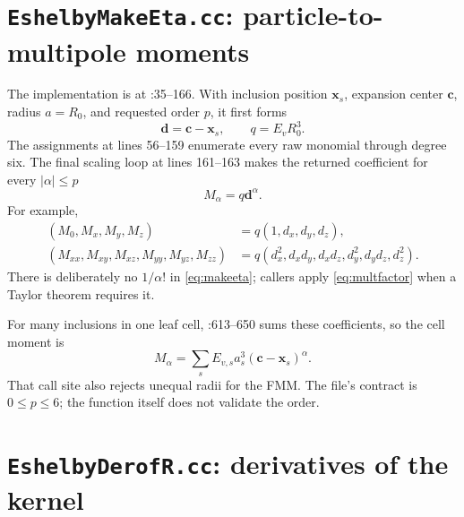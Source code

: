 \documentclass[11pt]{article}
\newcommand{\vect}[1]{\bm{#1}}
\newcommand{\abs}[1]{\left\lvert #1\right\rvert}
\begin{document}
\section{\texttt{EshelbyMakeEta.cc}: particle-to-multipole moments}

The implementation is at :35--166.  With inclusion
position \(\vect{x}_s\), expansion center \(\vect{c}\), radius \(a=R_0\), and
requested order \(p\), it first forms
\begin{equation}
\vect{d}=\vect{c}-\vect{x}_s,
\qquad q=E_vR_0^3.
\label{eq:makeeta-d}
\end{equation}
The assignments at lines 56--159 enumerate every raw monomial through degree
six.  The final scaling loop at lines 161--163 makes the returned coefficient
for every \(\abs{\alpha}\leq p\)
\begin{equation}
\boxed{M_\alpha=q\vect{d}^{\alpha}.}
\label{eq:makeeta}
\end{equation}
For example,
\[
\begin{aligned}
(M_0,M_x,M_y,M_z)&=q(1,d_x,d_y,d_z),\\
(M_{xx},M_{xy},M_{xz},M_{yy},M_{yz},M_{zz})
&=q(d_x^2,d_xd_y,d_xd_z,d_y^2,d_yd_z,d_z^2).
\end{aligned}
\]
There is deliberately no \(1/\alpha!\) in \eqref{eq:makeeta}; callers apply
\eqref{eq:multfactor} when a Taylor theorem requires it.

For many inclusions in one leaf cell, :613--650 sums
these coefficients, so the cell moment is
\begin{equation}
M_\alpha=\sum_s E_{v,s}a_s^3(\vect{c}-\vect{x}_s)^\alpha.
\label{eq:cell-moment}
\end{equation}
That call site also rejects unequal radii for the FMM.  The file's contract is
\(0\leq p\leq6\); the function itself does not validate the order.

\section{\texttt{EshelbyDerofR.cc}: derivatives of the kernel}
\end{document}
